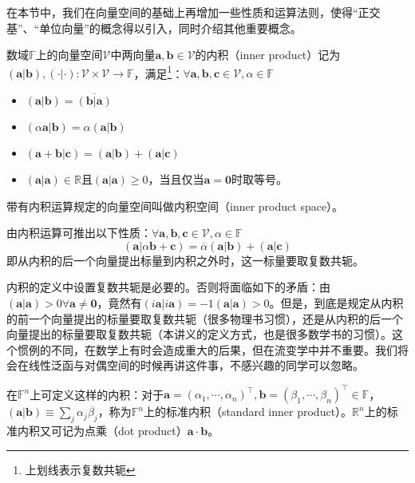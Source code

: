 \documentclass[main.tex]{subfiles}
\begin{document}
在本节中，我们在向量空间的基础上再增加一些性质和运算法则，使得“正交基”、“单位向量”的概念得以引入，同时介绍其他重要概念。

\begin{definition}[内积]
数域$\mathbb{F}$上的向量空间$\mathcal{V}$中两向量$\mathbf{a},\mathbf{b}\in\mathcal{V}$的内积（inner product）记为$\left(\mathbf{a}|\mathbf{b}\right),\left(\cdot|\cdot\right):\mathcal{V}\times\mathcal{V}\rightarrow\mathbb{F}$，满足\footnote{上划线表示复数共轭}：$\forall\mathbf{a},\mathbf{b},\mathbf{c}\in\mathcal{V},\alpha\in\mathbb{F}$
\begin{itemize}
    \item $\left(\mathbf{a}|\mathbf{b}\right)=\overline{\left(\mathbf{b}|\mathbf{a}\right)}$
    \item $\left(\alpha\mathbf{a}|\mathbf{b}\right)=\alpha\left(\mathbf{a}|\mathbf{b}\right)$
    \item $\left(\mathbf{a}+\mathbf{b}|\mathbf{c}\right)=\left(\mathbf{a}|\mathbf{b}\right)+\left(\mathbf{a}|\mathbf{c}\right)$
    \item $\left(\mathbf{a}|\mathbf{a}\right)\in\mathbb{R}$且$\left(\mathbf{a}|\mathbf{a}\right)\geq0$，当且仅当$\mathbf{a}=\mathbf{0}$时取等号。
\end{itemize}
带有内积运算规定的向量空间叫做内积空间（inner product space）。
\end{definition}

由内积运算可推出以下性质：$\forall\mathbf{a},\mathbf{b},\mathbf{c}\in\mathcal{V},\alpha\in\mathbb{F}$
\[\left(\mathbf{a}|\alpha\mathbf{b}+\mathbf{c}\right)=\overline{\alpha}\left(\mathbf{a}|\mathbf{b}\right)+\left(\mathbf{a}|\mathbf{c}\right)\]
即从内积的后一个向量提出标量到内积之外时，这一标量要取复数共轭。

内积的定义中设置复数共轭是必要的。否则将面临如下的矛盾：由$\left(\mathbf{a}|\mathbf{a}\right)>0\forall\mathbf{a}\neq\mathbf{0}$，竟然有$\left(i\mathbf{a}|i\mathbf{a}\right)=-1\left(\mathbf{a}|\mathbf{a}\right)>0$。但是，到底是规定从内积的前一个向量提出的标量要取复数共轭（很多物理书习惯），还是从内积的后一个向量提出的标量要取复数共轭（本讲义的定义方式，也是很多数学书的习惯）。这个惯例的不同，在数学上有时会造成重大的后果，但在流变学中并不重要。我们将会在线性泛函与对偶空间的时候再讲这件事，不感兴趣的同学可以忽略。

\begin{example}
在$\mathbb{F}^n$上可定义这样的内积：对于$\mathbf{a}=\left(\alpha_1,\cdots,\alpha_n\right)^\intercal,\mathbf{b}=\left(\beta_1,\cdots,\beta_n\right)^\intercal\in\mathbb{F}$，$\left(\mathbf{a}|\mathbf{b}\right)\equiv\sum_j\alpha_j\overline{\beta_j}$，称为$\mathbb{F}^n$上的标准内积（standard inner product）。$\mathbb{R}^n$上的标准内积又可记为点乘（dot product）$\mathbf{a}\cdot\mathbf{b}$。
\end{example}
\end{document}
